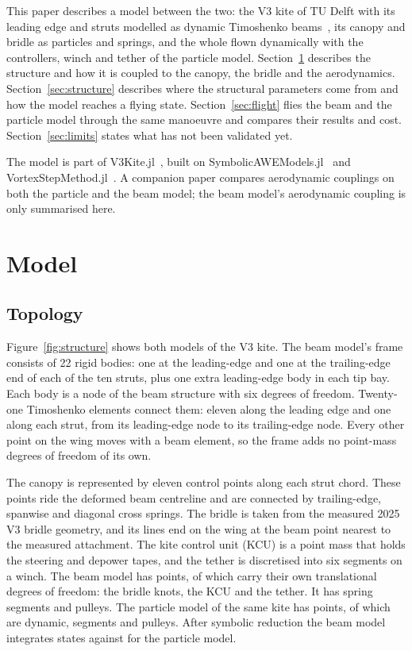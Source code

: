 \documentclass[11pt,a4paper]{article}
\begin{document}
This paper describes a model between the two: the V3 kite of TU Delft with its leading edge and struts modelled as dynamic Timoshenko beams~\cite{timoshenko1921}, its canopy and bridle as particles and springs, and the whole flown dynamically with the controllers, winch and tether of the particle model. Section~\ref{sec:model} describes the structure and how it is coupled to the canopy, the bridle and the aerodynamics. Section~\ref{sec:structure} describes where the structural parameters come from and how the model reaches a flying state. Section~\ref{sec:flight} flies the beam and the particle model through the same manoeuvre and compares their results and cost. Section~\ref{sec:limits} states what has not been validated yet.

The model is part of V3Kite.jl~\cite{v3kite}, built on SymbolicAWEModels.jl~\cite{symbolicawemodels} and VortexStepMethod.jl~\cite{vortexstepmethod}. A companion paper compares aerodynamic couplings on both the particle and the beam model; the beam model's aerodynamic coupling is only summarised here.

\section{Model}
\label{sec:model}

\subsection{Topology}

Figure~\ref{fig:structure} shows both models of the V3 kite. The beam model's frame consists of 22 rigid bodies: one at the leading-edge and one at the trailing-edge end of each of the ten struts, plus one extra leading-edge body in each tip bay. Each body is a node of the beam structure with six degrees of freedom. Twenty-one Timoshenko elements connect them: eleven along the leading edge and one along each strut, from its leading-edge node to its trailing-edge node. Every other point on the wing moves with a beam element, so the frame adds no point-mass degrees of freedom of its own.

The canopy is represented by eleven control points along each strut chord. These points ride the deformed beam centreline and are connected by trailing-edge, spanwise and diagonal cross springs. The bridle is taken from the measured 2025 V3 bridle geometry, and its lines end on the wing at the beam point nearest to the measured attachment. The kite control unit (KCU) is a point mass that holds the steering and depower tapes, and the tether is discretised into six segments on a winch. The beam model has \NPointsBeam{} points, of which \NDynamicPointsBeam{} carry their own translational degrees of freedom: the bridle knots, the KCU and the tether. It has \NSegmentsBeam{} spring segments and \NPulleysBeam{} pulleys. The particle model of the same kite has \NPointsPsm{} points, of which \NDynamicPointsPsm{} are dynamic, \NSegmentsPsm{} segments and \NPulleysPsm{} pulleys. After symbolic reduction the beam model integrates \NStatesBeam{} states against \NStatesPsm{} for the particle model.
\end{document}
